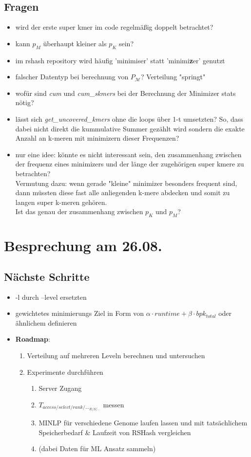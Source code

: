 \documentclass{article}
\begin{document}
\subsection*{Fragen}
\begin{itemize}
	\item wird der erste super kmer im code regelmäßig doppelt betrachtet?
	\item kann $p_M$ überhaupt kleiner als $p_K$ sein?
	\item im rshash repository wird häufig 'minimiser' statt 'minimi\textbf{z}er' genutzt
	\item falscher Datentyp bei berechnung von $P_\mathcal{M}$? Verteilung "springt"
	\item wofür sind \textit{cum} und \textit{cum\_skmers} bei der Berechnung der Minimizer stats nötig?
	\item lässt sich \textit{get\_uncovered\_kmers} ohne die loops über 1-t umsetzten? So, dass dabei nicht direkt die kummulative Summer gezählt wird sondern die exakte Anzahl an k-meren mit minimizern dieser Frequenzen?
	\item nur eine idee: könnte es nicht interessant sein, den zusammenhang zwischen der frequenz eines minimizers und der länge der zugehörigen super kmere zu betrachten? \\
	Vermutung dazu: wenn gerade "kleine" minimizer besonders frequent sind, dann müssten diese fast alle anliegenden k-mere abdecken und somit zu langen super k-meren gehören.\\
	Ist das genau der zusammenhang zwischen $p_K$ und $p_M$?
\end{itemize}

\section*{Besprechung am 26.08.}
\subsection*{Nächste Schritte}
\begin{itemize}
	\item -l durch --level ersetzten
	\item gewichtetes minimierungs Ziel in Form von $\alpha \cdot runtime + \beta \cdot bpk_{total}$ oder ähnlichem definieren
	\item \textbf{Roadmap}:
		\begin{enumerate}
			\item Verteilung auf mehreren Leveln berechnen und untersuchen 
			\item  Experimente durchführen
			\begin{enumerate}
				\item Server Zugang
				\item $T_{access/select/rank/..._{R/S/...}}$ messen
				\item MINLP für verschiedene Genome laufen lassen und mit tatsächlichem Speicherbedarf \& Laufzeit von RSHash vergleichen
				\item (dabei Daten für ML Ansatz sammeln)
			\end{enumerate}
		\end{enumerate}
\end{itemize}
\end{document}
